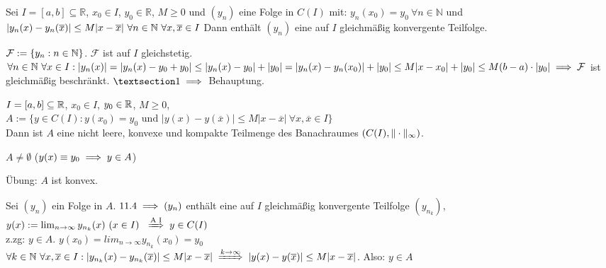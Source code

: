 \documentclass{article}
\begin{document}
\begin{satz}
Sei $I=[a,b]\subseteq\mathbb{R}$, $x_0\in I$, $y_0 \in \mathbb{R}$, $M \ge 0$ und $(y_n)$ eine Folge in $C(I)$ mit: $y_n(x_0)=y_0\ \forall n \in \mathbb{N}$ und $ | y_n(x) - y_n(\overline{x}) | \le M | x - \overline{x} |\ \forall n \in \mathbb{N}\ \forall x, \overline{x} \in I$
Dann enthält $(y_n)$ eine auf $I$ gleichmäßig konvergente Teilfolge.
\end{satz}

\begin{beweis}
$\mathcal{F} := \{y_n : n \in \mathbb{N} \}$. $\mathcal{F}$ ist auf $I$ gleichstetig. $\forall n \in \mathbb{N}\ \forall x \in I: |y_n(x)| = |y_n(x)-y_0+y_0| \le | y_n(x)-y_0| + |y_0| = |y_n(x)-y_n(x_0)| + |y_0| \le M |x-x_0| + |y_0| \le M(b-a)\cdot |y_0| \implies \mathcal{F}$ ist gleichmäßig beschränkt. $§1 \folgt$ Behauptung.
\end{beweis}

\begin{satz}
$I=[a,b] \subseteq \mathbb{R}$, $x_0 \in I$, $y_0 \in \mathbb{R}$, $M \ge 0$, \\
$A:=\{y \in C(I): y(x_0)=y_0 \text{ und } |y(x)-y(\overline{x})| \le M|x-\overline{x}|\ \forall x,\overline{x} \in I \}$ \\
Dann ist $A$ eine nicht leere, konvexe und kompakte Teilmenge des Banachraumes \nolinebreak $(C(I) \nolinebreak , \nolinebreak \| \nolinebreak \cdot \nolinebreak \|_\infty)$.
\end{satz}

\begin{beweis}
\item $A \ne \emptyset$ \quad ($y(x) \equiv y_0 \implies y \in A$)
\item Übung: $A$ ist konvex.
\item Sei $(y_n)$ ein Folge in $A$. $11.4 \implies (y_n)$ enthält eine auf $I$ gleichmäßig konvergente Teilfolge $(y_{n_k})$, $y(x):=\lim_{n \to \infty} y_{n_k}(x)\ (x \in I)\ \folgtnach{A I} y \in C(I)$ \\
z.zg: $y \in A$. $y(x_0)=lim_{n \to \infty} y_{n_k}(x_0) = y_0$ \\
$\forall k \in \MdN\ \forall x,\overline{x} \in I: |y_{n_k}(x)-y_{n_k}(\overline{x})| \le M|x-\overline{x}| \folgtwegen{k \to \infty} |y(x)-y(\overline{x})| \le M|x-\overline{x}|$. Also: $y \in A$
\end{beweis}
\end{document}
